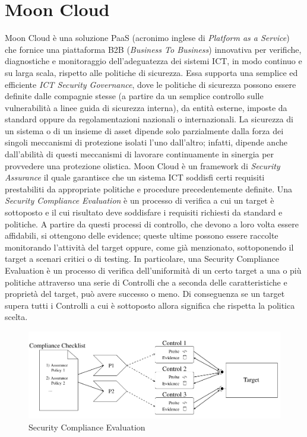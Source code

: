 \section{Moon Cloud}
Moon Cloud è una soluzione PaaS (acronimo inglese di \textit{Platform as a Service}) che fornice una piattaforma B2B 
(\textit{Business To Business}) innovativa per verifiche, diagnostiche e monitoraggio dell'adeguatezza dei sistemi ICT, in modo continuo e su larga scala,
rispetto alle politiche di sicurezza. Essa supporta una semplice ed efficiente \textit{ICT Security Governance}, dove le politiche 
di sicurezza possono essere definite dalle compagnie stesse (a partire da un semplice controllo sulle vulnerabilità a linee guida di
sicurezza interna), da entità esterne, imposte da standard oppure da regolamentazioni nazionali o internazionali.
La sicurezza di un sistema o di un insieme di asset dipende solo parzialmente dalla forza dei singoli meccanismi di protezione isolati
l'uno dall'altro; infatti, dipende anche dall'abilità di questi meccanismi di lavorare continuamente in sinergia per provvedere una 
protezione olistica.\hfill\break
Moon Cloud è un framework di \textit{Security Assurance} il quale garantisce che un sistema ICT soddisfi certi requisiti 
prestabiliti da appropriate politiche e procedure precedentemente definite. Una \textit{Security Compliance Evaluation} è un processo 
di verifica a cui un target è sottoposto e il cui risultato deve soddisfare i requisiti richiesti da standard e politiche. A partire da questi 
processi di controllo, che devono a loro volta essere affidabili, si ottengono delle evidence; queste ultime possono essere raccolte 
monitorando l'attività del target oppure, come già menzionato, sottoponendo il target a scenari critici o di testing.\hfill\break
In particolare, una Security Compliance Evaluation è un processo di verifica dell'uniformità di un certo target a una o più politiche 
attraverso una serie di Controlli che a seconda delle caratteristiche e proprietà del target, può avere successo o meno. Di 
conseguenza se un target supera tutti i Controlli a cui è sottoposto allora significa che rispetta la politica scelta.
\begin{figure}[ht!]
    \includegraphics[scale=0.5]{images/Security_Compliance_Evaluation.png}
    \caption{Security Compliance Evaluation}
    \label{fig:Security_Compliance_Evaluation}
\end{figure}
